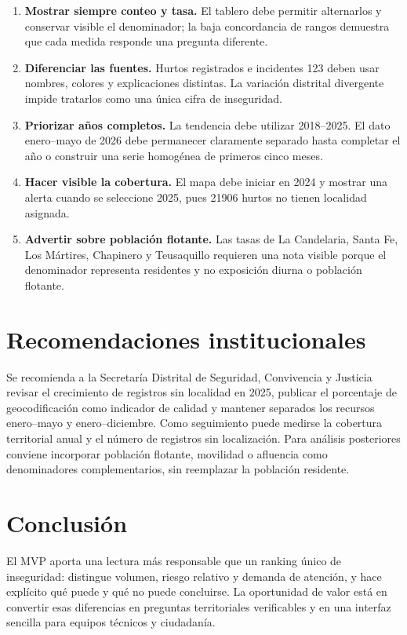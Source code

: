 \documentclass[11pt,letterpaper,oneside]{report}
\begin{document}
\begin{enumerate}
  \item \textbf{Mostrar siempre conteo y tasa.} El tablero debe permitir alternarlos y conservar visible el denominador; la baja concordancia de rangos demuestra que cada medida responde una pregunta diferente.
  \item \textbf{Diferenciar las fuentes.} Hurtos registrados e incidentes 123 deben usar nombres, colores y explicaciones distintas. La variación distrital divergente impide tratarlos como una única cifra de inseguridad.
  \item \textbf{Priorizar años completos.} La tendencia debe utilizar 2018--2025. El dato enero--mayo de 2026 debe permanecer claramente separado hasta completar el año o construir una serie homogénea de primeros cinco meses.
  \item \textbf{Hacer visible la cobertura.} El mapa debe iniciar en 2024 y mostrar una alerta cuando se seleccione 2025, pues \num{21906} hurtos no tienen localidad asignada.
  \item \textbf{Advertir sobre población flotante.} Las tasas de La Candelaria, Santa Fe, Los Mártires, Chapinero y Teusaquillo requieren una nota visible porque el denominador representa residentes y no exposición diurna o población flotante.
\end{enumerate}

\section{Recomendaciones institucionales}

Se recomienda a la Secretaría Distrital de Seguridad, Convivencia y Justicia revisar el crecimiento de registros sin localidad en 2025, publicar el porcentaje de geocodificación como indicador de calidad y mantener separados los recursos enero--mayo y enero--diciembre. Como seguimiento puede medirse la cobertura territorial anual y el número de registros sin localización. Para análisis posteriores conviene incorporar población flotante, movilidad o afluencia como denominadores complementarios, sin reemplazar la población residente.

\section{Conclusión}

El MVP aporta una lectura más responsable que un ranking único de inseguridad: distingue volumen, riesgo relativo y demanda de atención, y hace explícito qué puede y qué no puede concluirse. La oportunidad de valor está en convertir esas diferencias en preguntas territoriales verificables y en una interfaz sencilla para equipos técnicos y ciudadanía.
\end{document}
